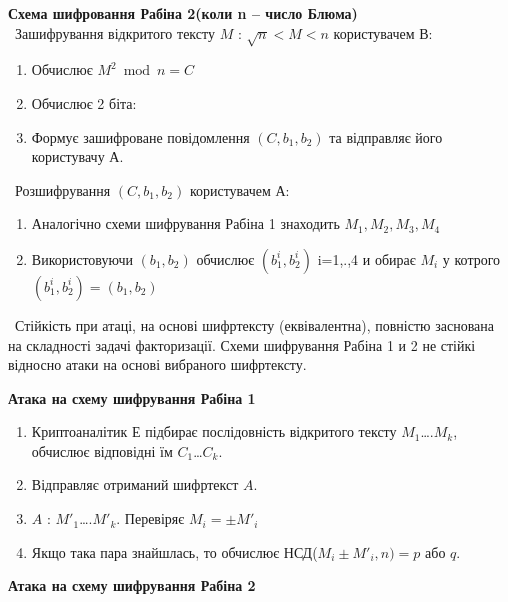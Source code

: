\textbf{Схема шифровання Рабіна 2(коли n – число Блюма)}\\
\ Зашифрування  відкритого тексту $M$ : $\sqrt{n}<M<n$ користувачем В:
\begin{enumerate}
        \item Обчислює $M^2\bmod n=C$
        \item Обчислює 2 біта: %
        \item Формує зашифроване повідомлення $(C,b_1,b_2)$ та відправляє його користувачу А.   
\end{enumerate}
\ Розшифрування  $(C,b_1,b_2)$ користувачем  А:
\begin{enumerate}
        \item  Аналогічно схеми шифрування Рабіна 1 знаходить ${M_1,M_2,M_3,M_4}$
        \item Використовуючи $(b_1,b_2)$  обчислює $ (b^i_1, b^i_2) $ i=1,.,4 и  обирає $M_i$ у котрого $(b^i_1, b^i_2)= (b_1,b_2) $    
\end{enumerate}
\ Стійкість при атаці, на основі шифртексту (еквівалентна), повністю заснована на складності задачі факторизації. Схеми шифрування Рабіна 1 и 2 не стійкі  відносно атаки на основі вибраного шифртексту.

\textbf{Атака на схему шифрування Рабіна 1}
\begin{enumerate}
        \item Криптоаналітик Е підбирає послідовність
        відкритого тексту $M_1$….$M_k$, обчислює відповідні їм  $C_1$…$C_k$.
        \item Відправляє отриманий шифртекст $A$.
        \item  $A$ : $M'_1$….$M'_k$. Перевіряє $M_i=\pm M'_i$
        \item Якщо така пара знайшлась, то обчислює НСД($M_i\pm M'_i,n)=p$ або $q$.     
\end{enumerate}

\textbf{Атака на схему шифрування Рабіна 2}

